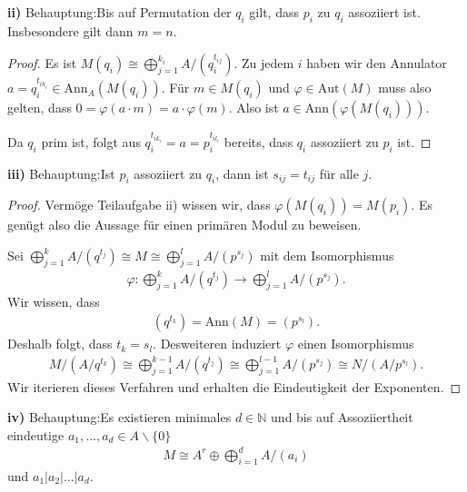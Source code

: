 \documentclass{article}
\theoremstyle{definition}
\theoremstyle{plain}
\theoremstyle{remark}
\newcommand{\claim}{\textsf{Behauptung}:\hspace{0,2cm}}
\newcommand{\teilaufgabe}[1]{
	{
		\vspace*{0.2cm}
		\textsf{\textbf{#1)}}
	}
}
\begin{document}
 \teilaufgabe{ii} \claim Bis auf Permutation der $q_i$ gilt, dass $p_i$ zu $q_i$ assoziiert ist. Insbesondere gilt dann $m=n$. 
 \begin{proof}
	 Es ist $M(q_i)\cong \bigoplus_{j=1}^{k_i}A/(q_i^{t_{ij}})$. Zu jedem $i$ haben wir den Annulator $a=q_i^{t_{ik_i}}\in \mathrm{Ann}_A(M(q_i))$. Für $m\in M(q_i)$ und $\varphi\in \mathrm{Aut}(M)$ muss also gelten, dass $0=\varphi(a\cdot m)=a\cdot \varphi(m)$. Also ist $a\in \mathrm{Ann}(\varphi(M(q_i)))$. 

	 Da $q_i$ prim ist, folgt aus $q_{i}^{t_{ik_i}}=a=p_{i}^{t_{il_i}}$ bereits, dass $q_i$ assoziiert zu $p_i$ ist. 
 \end{proof}
 \teilaufgabe{iii} \claim Ist $p_i$ assoziiert zu $q_i$, dann ist $s_{ij}=t_{ij}$ für alle $j$.
\begin{proof}
	Vermöge Teilaufgabe ii) wissen wir, dass $\varphi(M(q_i))=M(p_i)$. Es genügt also die Aussage für einen primären Modul zu beweisen.
	
	Sei $\bigoplus_{j=1}^kA/(q^{t_{j}})\cong M\cong\bigoplus_{j=1}^lA/(p^{s_{j}})$ mit dem Isomorphismus 
	\begin{align}
		\varphi:\bigoplus_{j=1}^kA/(q^{t_{j}})\to \bigoplus_{j=1}^lA/(p^{s_{j}}).
	\end{align} 
	Wir wissen, dass 
	\begin{align}
		(q^{t_k})= \mathrm{Ann}(M)= (p^{s_l}).
	\end{align}
	Deshalb folgt, dass $t_k = s_l$. Desweiteren induziert $\varphi$ einen Isomorphismus 
	\begin{align}
		M/(A/q^{t_k})\cong \bigoplus_{j=1}^{k-1}A/(q^{t_{j}})\cong \bigoplus_{j=1}^{l-1}A/(p^{s_{j}})\cong N/(A/p^{s_l}).
	\end{align}
	Wir iterieren dieses Verfahren und erhalten die Eindeutigkeit der Exponenten.
	\end{proof}
\teilaufgabe{iv} \claim Es existieren minimales $d\in\mathbb{N}$ und bis auf Assoziiertheit eindeutige $a_1,...,a_d\in A\backslash\{0\}$ 
\begin{align}
	M\cong A^r\oplus\bigoplus_{i=1}^dA/(a_i)
\end{align}
und $a_1|a_2|...|a_d$.
\end{document}

